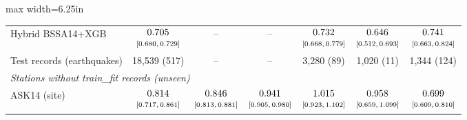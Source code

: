 \begin{table}[htbp]
\begin{adjustbox}{max width=6.25in}
\begin{tabular}{lcccccc}
Hybrid BSSA14+XGB & $\begin{array}{@{}c@{}}0.705\\[-1pt] \scriptstyle[0.680,\,0.729]\end{array}$ & -- & -- & $\begin{array}{@{}c@{}}0.732\\[-1pt] \scriptstyle[0.668,\,0.779]\end{array}$ & $\begin{array}{@{}c@{}}0.646\\[-1pt] \scriptstyle[0.512,\,0.693]\end{array}$ & $\begin{array}{@{}c@{}}0.741\\[-1pt] \scriptstyle[0.663,\,0.824]\end{array}$ \\
Test records (earthquakes) & 18,539 (517) & -- & -- & 3,280 (89) & 1,020 (11) & 1,344 (124) \\
\midrule
\multicolumn{7}{l}{\textit{Stations without train\_fit records (unseen)}} \\
ASK14 (site) & $\begin{array}{@{}c@{}}0.814\\[-1pt] \scriptstyle[0.717,\,0.861]\end{array}$ & $\begin{array}{@{}c@{}}0.846\\[-1pt] \scriptstyle[0.813,\,0.881]\end{array}$ & $\begin{array}{@{}c@{}}0.941\\[-1pt] \scriptstyle[0.905,\,0.980]\end{array}$ & $\begin{array}{@{}c@{}}1.015\\[-1pt] \scriptstyle[0.923,\,1.102]\end{array}$ & $\begin{array}{@{}c@{}}0.958\\[-1pt] \scriptstyle[0.659,\,1.099]\end{array}$ & $\begin{array}{@{}c@{}}0.699\\[-1pt] \scriptstyle[0.609,\,0.810]\end{array}$ \\

\end{tabular}
\end{adjustbox}
\end{table}
